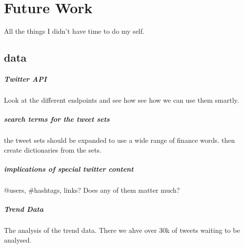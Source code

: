 
\chapter{Future Work}\label{futurework}
All the things I didn't have time to do my self. 

\section{data}
\paragraph{Twitter API}
Look at the different endpoints and see how see how we can use them smartly.

\paragraph{search terms for the tweet sets}
the tweet sets should be expanded to use a wide range of finance words. then
create dictionaries from the sets. 

\paragraph{implications of special twitter content}
@users, #hashtags, links? Does any of them matter much?

\paragraph{Trend Data}
The analysis of the trend data. There we ahve over 30k of tweets waiting to be
analysed. 
